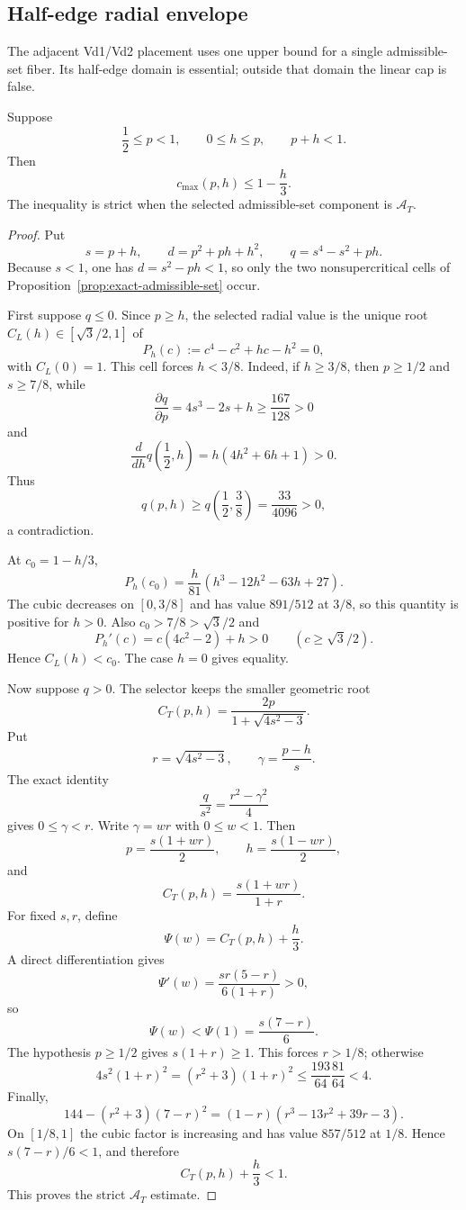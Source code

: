 \subsection{Half-edge radial envelope}
\label{sec:half-edge-envelope}

The adjacent Vd1/Vd2 placement uses one upper bound for a single admissible-set
fiber.  Its half-edge domain is essential; outside that domain the linear cap
is false.

\begin{lemma}
\label{lem:half-edge-radial-envelope}
Suppose
\[
 \frac12\le p<1,
 \qquad
 0\le h\le p,
 \qquad
 p+h<1.
\]
Then
\begin{equation}
 c_{\max}(p,h)\le1-\frac h3.
 \label{eq:half-edge-radial-envelope}
\end{equation}
The inequality is strict when the selected admissible-set component is
$\mathcal A_T$.
\end{lemma}

\begin{proof}
Put
\[
 s=p+h,
 \qquad
 d=p^2+ph+h^2,
 \qquad
 q=s^4-s^2+ph.
\]
Because $s<1$, one has $d=s^2-ph<1$, so only the two nonsupercritical cells
of Proposition~\ref{prop:exact-admissible-set} occur.

First suppose $q\le0$.  Since $p\ge h$, the selected radial value is the
unique root $C_L(h)\in[\sqrt3/2,1]$ of
\[
 P_h(c):=c^4-c^2+hc-h^2=0,
\]
with $C_L(0)=1$.  This cell forces $h<3/8$.  Indeed, if $h\ge3/8$, then
$p\ge1/2$ and $s\ge7/8$, while
\[
 \frac{\partial q}{\partial p}
 =4s^3-2s+h
 \ge\frac{167}{128}>0
\]
and
\[
 \frac{d}{dh}q\left(\frac12,h\right)
 =h(4h^2+6h+1)>0.
\]
Thus
\[
 q(p,h)\ge q\left(\frac12,\frac38\right)
 =\frac{33}{4096}>0,
\]
a contradiction.

At $c_0=1-h/3$,
\[
 P_h(c_0)
 =\frac h{81}\left(h^3-12h^2-63h+27\right).
\]
The cubic decreases on $[0,3/8]$ and has value $891/512$ at $3/8$, so this
quantity is positive for $h>0$.  Also $c_0>7/8>\sqrt3/2$ and
\[
 P_h'(c)=c(4c^2-2)+h>0
 \qquad(c\ge\sqrt3/2).
\]
Hence $C_L(h)<c_0$.  The case $h=0$ gives equality.

Now suppose $q>0$.  The selector keeps the smaller geometric root
\[
 C_T(p,h)=\frac{2p}{1+\sqrt{4s^2-3}}.
\]
Put
\[
 r=\sqrt{4s^2-3},
 \qquad
 \gamma=\frac{p-h}{s}.
\]
The exact identity
\[
 \frac q{s^2}=\frac{r^2-\gamma^2}{4}
\]
gives $0\le\gamma<r$.  Write $\gamma=wr$ with $0\le w<1$.  Then
\[
 p=\frac{s(1+wr)}2,
 \qquad
 h=\frac{s(1-wr)}2,
\]
and
\[
 C_T(p,h)=\frac{s(1+wr)}{1+r}.
\]
For fixed $s,r$, define
\[
 \Psi(w)=C_T(p,h)+\frac h3.
\]
A direct differentiation gives
\[
 \Psi'(w)=\frac{sr(5-r)}{6(1+r)}>0,
\]
so
\[
 \Psi(w)<\Psi(1)=\frac{s(7-r)}6.
\]
The hypothesis $p\ge1/2$ gives $s(1+r)\ge1$.  This forces $r>1/8$;
otherwise
\[
 4s^2(1+r)^2=(r^2+3)(1+r)^2
 \le\frac{193}{64}\frac{81}{64}<4.
\]
Finally,
\[
 144-(r^2+3)(7-r)^2
 =(1-r)(r^3-13r^2+39r-3).
\]
On $[1/8,1]$ the cubic factor is increasing and has value $857/512$ at
$1/8$.  Hence $s(7-r)/6<1$, and therefore
\[
 C_T(p,h)+\frac h3<1.
\]
This proves the strict $\mathcal A_T$ estimate.
\end{proof}

